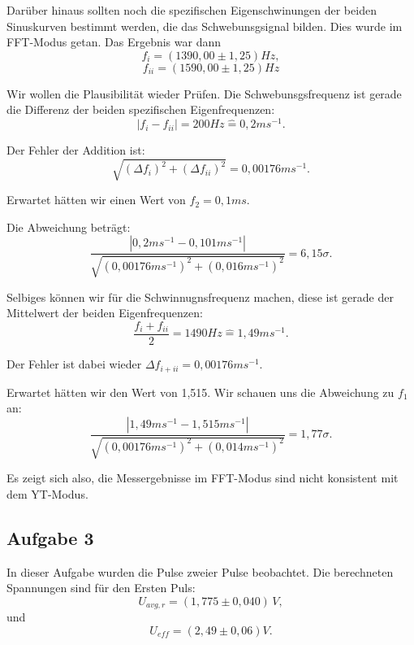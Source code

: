 Darüber hinaus sollten noch die spezifischen Eigenschwinungen der beiden Sinuskurven bestimmt werden, die das Schwebunsgsignal bilden. Dies wurde im FFT-Modus getan. Das Ergebnis war dann
\begin{equation}
    \boxed{
        f_{i} = (1390,00 \pm 1,25) Hz
    },
\end{equation}
\begin{equation}
    \boxed{
        f_{ii} = (1590,00 \pm 1,25) Hz
    }
\end{equation}

Wir wollen die Plausibilität wieder Prüfen. Die Schwebunsgsfrequenz ist gerade die Differenz der beiden spezifischen Eigenfrequenzen:
\begin{equation}
    \left| f_i - f_{ii} \right| = 200Hz \hat = 0,2ms^{-1}.
\end{equation}

Der Fehler der Addition ist:
\begin{equation}
    \sqrt{(\Delta f_i )^2 + (\Delta f_{ii})^2} = 0,00176ms^{-1}.
\end{equation}

Erwartet hätten wir einen Wert von $f_2 = 0,1ms$. 

Die Abweichung beträgt:
\begin{equation}
    \frac{\left| 0,2ms^{-1} - 0,101ms^{-1} \right|}{\sqrt{(0,00176ms^{-1})^2 + (0,016ms^{-1})^2}} = 6,15\sigma.
\end{equation}

Selbiges können wir für die Schwinnugnsfrequenz machen, diese ist gerade der Mittelwert der beiden Eigenfrequenzen:
\begin{equation}
\frac{f_i + f_{ii}}{2} = 1490 Hz \hat = 1,49 ms^{-1}.
\end{equation}

Der Fehler ist dabei wieder $\Delta f_{i+ii} = 0,00176ms^{-1}$.

Erwartet hätten wir den Wert von 1,515. Wir schauen uns die Abweichung zu $f_1$ an:
\begin{equation}
\frac{\left| 1,49 ms^{-1} -  1,515 ms^{-1} \right|}{\sqrt{(0,00176ms^{-1})^2 + (0,014ms^{-1})^2}} = 1,77\sigma.
\end{equation}

Es zeigt sich also, die Messergebnisse im FFT-Modus sind nicht konsistent mit dem YT-Modus.

\subsection*{Aufgabe 3}
In dieser Aufgabe wurden die Pulse zweier Pulse beobachtet. Die berechneten Spannungen sind für den Ersten Puls:
\begin{equation}
\boxed{
    U_{avg,r} = (1,775 \pm 0,040) \, V
},
\end{equation}
und 
\begin{equation}
    \boxed{
        U_{eff} = (2,49 \pm 0,06) V
    }.
\end{equation}

